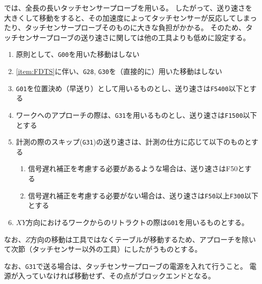 \clearpage
\DMname では、全長の長いタッチセンサープローブを用いる。
したがって、送り速さを大きくして移動をすると、その加速度によってタッチセンサーが反応してしまったり、タッチセンサープローブそのものに大きな負担がかかる。
そのため、タッチセンサープローブの送り速さに関しては他の工具よりも低めに設定する。
\begin{enumerate}[label=\Roman*., ref=\Roman*]
\item \label{item:FDTS} 原則として、\verb|G00|を用いた移動はしない
\item \ref{item:FDTS}に伴い、\verb|G28|, \verb|G30|を（直接的に）用いた移動はしない
\item \verb|G01|を位置決め（早送り）として用いるものとし、送り速さは\verb|F5400|以下とする
\item ワークへのアプローチの際は、\verb|G31|を用いるものとし、送り速さは\verb|F1500|以下とする
\item 計測の際のスキップ(\verb|G31|)の送り速さは、計測の仕方に応じて以下のものとする
  \begin{enumerate}
  \item {}信号遅れ補正を考慮する必要があるような場合は、送り速さはF50とする
  \item 信号遅れ補正を考慮する必要がない場合は、送り速さは\verb|F50|以上\verb|F300|以下とする
  \end{enumerate}
\item $XY$方向におけるワークからのリトラクトの際は\verb|G01|を用いるものとする。
\end{enumerate}
なお、$Z$方向の移動は工具ではなくテーブルが移動するため、アプローチを除いて次節（タッチセンサー以外の工具）にしたがうものとする。

なお、\verb|G31|で送る場合は、タッチセンサープローブの電源を入れて行うこと。
電源が入っていなければ移動せず、その点がブロックエンドとなる。



